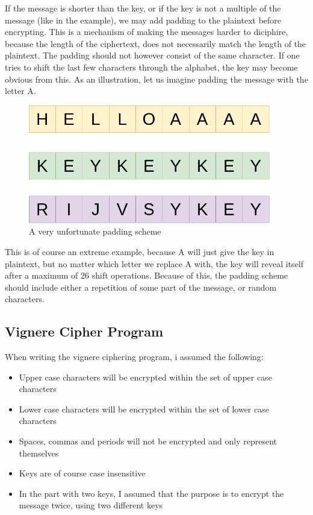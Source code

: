 \documentclass{article}
\begin{document}
If the message is shorter than the key, or if the key is not a multiple of the message (like in the example), we may add padding to the plaintext before encrypting. This is a mechanism of making the messages harder to diciphire, because the length of the ciphertext, does not necessarily match the length of the plaintext. The padding should not however consist of the same character. If one tries to shift the last few characters through the alphabet, the key may become obvious from this. As an illustration, let us imagine padding the message with the letter A. 

\begin{figure}[H]
 \centering
  \includegraphics[width=300pt]{img/vigneredraw4.png}
 \caption{A very unfortunate padding scheme}
 \end{figure}

This is of course an extreme example, because A will just give the key in plaintext, but no matter which letter we replace A with, the key will reveal itself after a maximum of 26 shift operations. Because of this, the padding scheme should include either a repetition of some part of the message, or random characters. 

\subsection{Vignere Cipher Program}

When writing the vignere ciphering program, i assumed the following:
\begin{itemize}
\item{Upper case characters will be encrypted within the set of upper case characters}
\item{Lower case characters will be encrypted within the set of lower case characters}
\item{Spaces, commas and periods will not be encrypted and only represent themselves}
\item{Keys are of course case insensitive}
\item{In the part with two keys, I assumed that the purpose is to encrypt the message twice, using two different keys}
\end{itemize}
\end{document}
